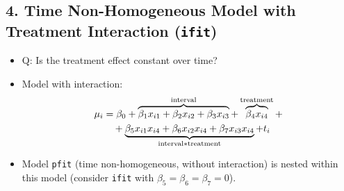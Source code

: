 \documentclass{article}\usepackage[]{graphicx}\usepackage[svgnames]{xcolor}
\let\log\relax%
\begin{document}
\subsection*{4. Time Non-Homogeneous Model with Treatment Interaction (\texttt{ifit})}
\begin{itemize}
    \item Q: Is the treatment effect constant over time?
    \item Model with interaction:
          \textcolor{Green}{\begin{align*}
                  \log{\mu_i}
                   & =\beta_0+\overbrace{\beta_1x_{i1}+\beta_2x_{i2}+\beta_3x_{i3}}^{\text{interval}}+\overbrace{\beta_4x_{i4}}^{\text{treatment}}+ \\
                   & \quad +\underbrace{\beta_5x_{i1}x_{i4}+\beta_6x_{i2}x_{i4}+\beta_7x_{i3}x_{i4}}_{\text{interval$*$treatment}}+\log{t_i}
              \end{align*}}
    \item Model \texttt{pfit} (time non-homogeneous, without interaction) is nested within this
          model (consider \texttt{ifit} with $ \beta_5=\beta_6=\beta_7=0 $).
\end{itemize}
\end{document}
